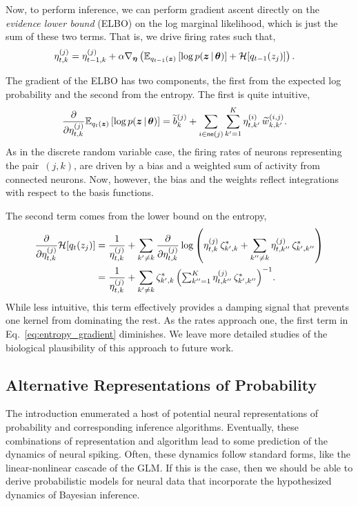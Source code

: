 Now, to perform inference, we can perform gradient ascent directly on the
\emph{evidence lower bound} (ELBO) on the log marginal likelihood,
which is just the sum of these two terms. That is, we drive firing
rates such that,
\begin{align}
  \eta_{t,k}^{(j)} %
  &= \eta_{t-1,k}^{(j)} +
  \alpha \nabla_{\boldsymbol{\eta}} \left( \bbE_{q_{t-1}(\bz)} \left[ \log p(\bz \given \btheta) \right] + \mcH[q_{t-1}(z_j)] \right).
\end{align}

The gradient of the ELBO has two components, the first from the
expected log probability and the second from the entropy. The first is
quite intuitive,
\begin{align}
  \frac{\partial}{\partial \eta_{t,k}^{(j)}} \mathbb{E}_{q_t(\boldsymbol{z})} \left[ \log p(\boldsymbol{z} \,|\, \boldsymbol{\theta}) \right]
  &=
  \widetilde{b}_k^{(j)} +
  \sum_{i \in \mathsf{ne}(j)} \sum_{k'=1}^K \eta_{t,k'}^{(i)} \, \widetilde{w}_{k,k'}^{(i,j)}.
\end{align}
As in the discrete random variable case, the firing rates of neurons representing
the pair~$(j,k)$, are driven by a bias and a weighted sum of activity from
connected neurons. Now, however, the bias and the weights reflect integrations
with respect to the basis functions.

The second term comes from the lower bound on the entropy, 
\begin{align}
  \frac{\partial}{\partial \eta_{t,k}^{(j)}} \mathcal{H}[q_t(z_j)] 
  &=
  \frac{1}{\eta_{t,k}^{(j)}}
  + \sum_{k' \neq k} \frac{\partial}{\partial \eta_{t,k}^{(j)}}
  \log \left( \eta_{t,k}^{(j)} \, \zeta_{k',k}^\ast
  + \sum_{k''\neq k} \eta_{t,k''}^{(j)} \, \zeta_{k',k''}^\ast \right) \\
  \label{eq:entropy_gradient}
  &= \frac{1}{\eta_{t,k}^{(j)}}
  + \sum_{k'\neq k}
  {\zeta^{\ast}_{k',k}} \,
  \Big({\textstyle{\sum}_{k''=1}^K \, \eta_{t,k''}^{(j)} \, \zeta_{k',k''}^\ast} \Big)^{-1}.
\end{align}
While less intuitive, this term effectively provides a damping 
signal that prevents one kernel from dominating the rest. As the
rates approach one, the first term in Eq.~\ref{eq:entropy_gradient}
diminishes. We leave more detailed studies of the biological plausibility
of this approach to future work.

\subsection{Alternative Representations of Probability}
The introduction enumerated a host of potential neural representations
of probability and corresponding inference algorithms. Eventually, these
combinations of representation and algorithm lead to some prediction of
the dynamics of neural spiking. Often, these dynamics follow standard forms,
like the linear-nonlinear cascade of the GLM. If this is the case, then
we should be able to derive probabilistic models for neural data that
incorporate the hypothesized dynamics of Bayesian inference.

